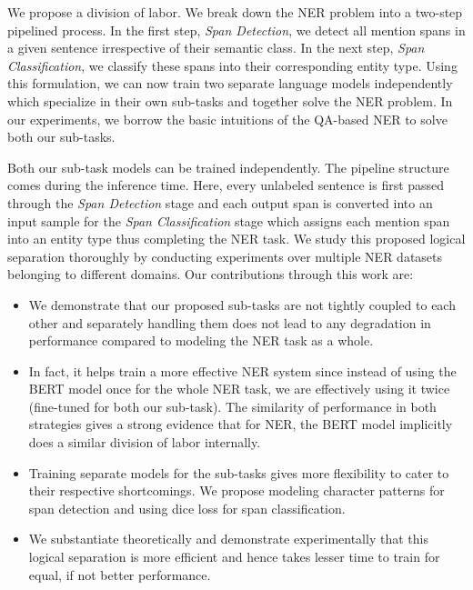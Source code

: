 We propose a division of labor. We break down the NER problem into a two-step pipelined process. In the first step, \textit{Span Detection}, we detect all mention spans in a given sentence irrespective of their semantic class. In the next step, \textit{Span Classification}, we classify these spans into their corresponding entity type. Using this formulation, we can now train two separate language models independently which specialize in their own sub-tasks and together solve the NER problem. In our experiments, we borrow the basic intuitions of the QA-based NER to solve both our sub-tasks.

Both our sub-task models can be trained independently. The pipeline structure comes during the inference time. Here, every unlabeled sentence is first passed through the \textit{Span Detection} stage and each output span is converted into an input sample for the \textit{Span Classification} stage which assigns each mention span into an entity type thus completing the NER task. We study this proposed logical separation thoroughly by conducting experiments over multiple NER datasets belonging to different domains. Our contributions through this work are:

\begin{itemize}
    \item We demonstrate that our proposed sub-tasks are not tightly coupled to each other and separately handling them does not lead to any degradation in performance compared to modeling the NER task as a whole. 
    
    \item In fact, it helps train a more effective NER system since instead of using the BERT model once for the whole NER task, we are effectively using it twice (fine-tuned for both our sub-task). The similarity of performance in both strategies gives a strong evidence that for NER, the BERT model implicitly does a similar division of labor internally.
    
    \item Training separate models for the sub-tasks gives more flexibility to cater to their respective shortcomings. We propose modeling character patterns for span detection and using dice loss for span classification.
    
    \item We substantiate theoretically and demonstrate experimentally that this logical separation is more efficient and hence takes lesser time to train for equal, if not better performance.
\end{itemize}
